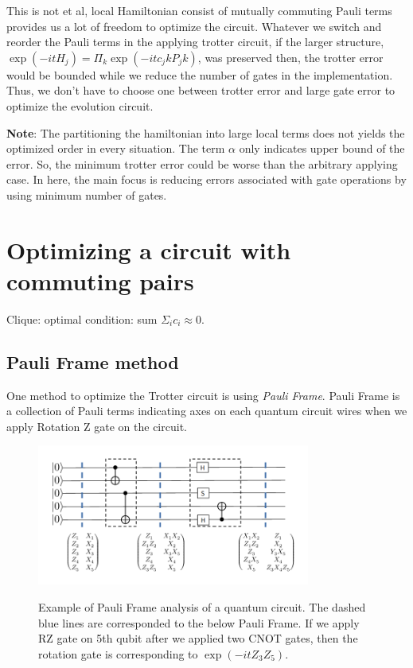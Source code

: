 \documentclass[a4paper,12pt]{article}
\begin{document}
This is not et al, local Hamiltonian consist of mutually commuting Pauli terms provides us a lot of freedom
to optimize the circuit. 
Whatever we switch and reorder the Pauli terms in the applying trotter circuit,
if the larger structure, $\exp(-it H_j) = \Pi_k \exp(-it c_jk P_jk)$, was preserved then, 
the trotter error would be bounded while we reduce the number of gates in the implementation.
Thus, we don't have to choose one between trotter error and large gate error
to optimize the evolution circuit.

\textbf{Note}: The partitioning the hamiltonian into large local terms does not yields the optimized 
order in every situation. 
The term $\alpha$ only indicates upper bound of the error. So, the minimum trotter error could be 
worse than the arbitrary applying case. 
In here, the main focus is reducing errors associated with gate operations by using minimum
number of gates.



\section{Optimizing a circuit with commuting pairs}

Clique: optimal condition: sum $ \Sigma_{i} c_i \approx 0 $.

\subsection{Pauli Frame method}

One method to optimize the Trotter circuit is using \textit{Pauli Frame}\cite{schmitz_graph_2023}.
Pauli Frame is a collection of Pauli terms indicating axes on each quantum circuit wires
when we apply Rotation Z gate on the circuit.

\begin{figure}
    \centering
    \includegraphics[width = 0.8\textwidth]{figures/Pauli Frame.png}
    \label{fig:Pauli Frame}
    \caption{
        Example of Pauli Frame analysis of a quantum circuit. 
        The dashed blue lines are corresponded to the below Pauli Frame.
        If we apply RZ gate on 5th qubit after we applied two CNOT gates,
        then the rotation gate is corresponding to $\exp(-i t Z_3Z_5)$.
    }
\end{figure}
\end{document}
